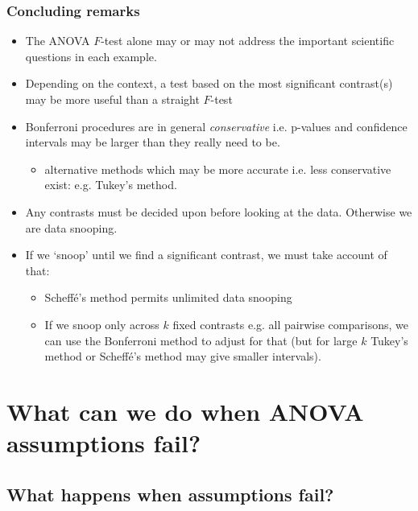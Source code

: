 \documentclass[a4paper]{article}\usepackage[]{graphicx}\usepackage[]{xcolor}
\begin{document}
\subsubsection{Concluding remarks}
\begin{itemize}
	\item The ANOVA \( F \)-test alone may or may not address the important scientific questions in each example.
	\item Depending on the context, a test based on the most significant contrast(s) may be more useful than a straight \( F \)-test
	\item Bonferroni procedures are in general \textit{conservative} i.e. p-values and confidence intervals may be larger than they really need to be.
	\begin{itemize}
		\item alternative methods which may be more accurate i.e. less conservative exist: e.g. Tukey's method.
	\end{itemize}
	\item Any contrasts must be decided upon before looking at the data. Otherwise we are data snooping.
	\item If we `snoop' until we find a significant contrast, we must take account of that:
	\begin{itemize}
		\item Scheffé's method permits unlimited data snooping
		\item If we snoop only across \( k \) fixed contrasts e.g. all pairwise comparisons, we can use the Bonferroni method to adjust for that (but for large \( k \) Tukey's method or Scheffé's method may give smaller intervals).
	\end{itemize}
\end{itemize}

\section{What can we do when ANOVA assumptions fail?}\label{sec:23}
\subsection{What happens when assumptions fail?}
\end{document}

